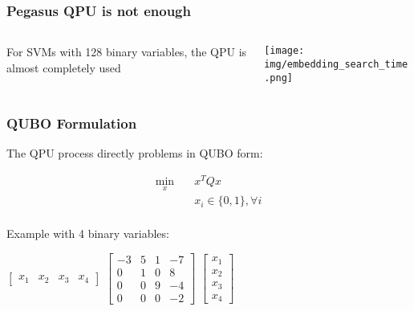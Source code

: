 \documentclass[aspectratio=169]{beamer}
\begin{document}
\begin{frame}
    \frametitle{Pegasus QPU is not enough}

    \begin{columns}
        \begin{column}{0.5\textwidth}
            For SVMs with 128 binary variables, the QPU is almost completely used
        \end{column}
        \begin{column}{0.5\textwidth}
            \centering
            \texttt{[image: img/embedding\_search\_time.png]}
        \end{column}
    \end{columns}

\end{frame}

\begin{frame}
    \frametitle{QUBO Formulation}

    The QPU process directly problems in QUBO form:

    \begin{equation*}
        \begin{aligned}
            \min_{x} \quad & x^TQx\\
            &x_i\in\{0, 1\}, \forall i    \\
        \end{aligned}
    \end{equation*}  

    Example with 4 binary variables:

    \begin{center}         
        $\begin{bmatrix}
          x_1 & x_2 & x_3 & x_4
        \end{bmatrix}$
        $\begin{bmatrix}
          -3 & 5 & 1 & -7 \\
          0 & 1 & 0 & 8 \\
          0 & 0 & 9 & -4 \\
          0 & 0 & 0 & -2 
        \end{bmatrix}$
        $\begin{bmatrix}
          x_1 \\ x_2 \\ x_3 \\ x_4
        \end{bmatrix}$      
    \end{center}

\end{frame}
\end{document}
